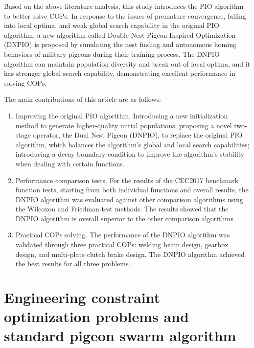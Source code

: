 \documentclass[preprint,review,compress,12pt]{elsarticle}
\begin{document}
Based on the above literature analysis, this study introduces the PIO algorithm to better solve COPs. In response to the issues of premature convergence, falling into local optima, and weak global search capability in the original PIO algorithm, a new algorithm called Double Nest Pigeon-Inspired Optimization (DNPIO) is proposed by simulating the nest finding and autonomous homing behaviors of military pigeons during their training process. The DNPIO algorithm can maintain population diversity and break out of local optima, and it has stronger global search capability, demonstrating excellent performance in solving COPs.

The main contributions of this article are as follows:
\begin{enumerate}[(1)]
\item Improving the original PIO algorithm. Introducing a new initialization method to generate higher-quality initial populations; proposing a novel two-stage operator, the Dual Nest Pigeon (DNPIO), to replace the original PIO algorithm, which balances the algorithm's global and local search capabilities; introducing a decay boundary condition to improve the algorithm's stability when dealing with certain functions.

\item Performance comparison tests. For the results of the CEC2017 benchmark function tests, starting from both individual functions and overall results, the DNPIO algorithm was evaluated against other comparison algorithms using the Wilcoxon and Friedman test methods. The results showed that the DNPIO algorithm is overall superior to the other comparison algorithms.

\item Practical COPs solving. The performance of the DNPIO algorithm was validated through three practical COPs: welding beam design, gearbox design, and multi-plate clutch brake design. The DNPIO algorithm achieved the best results for all three problems.

\end{enumerate}  

\section{Engineering constraint optimization problems and standard pigeon swarm algorithm}
\end{document}
